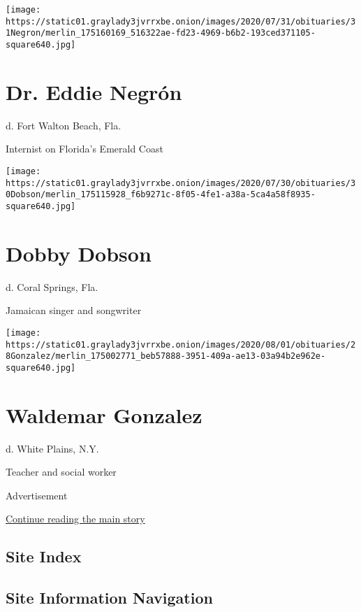 \texttt{[image: https://static01.graylady3jvrrxbe.onion/images/2020/07/31/obituaries/31Negron/merlin\_175160169\_516322ae-fd23-4969-b6b2-193ced371105-square640.jpg]}

\hypertarget{dr-eddie-negruxf3n}{%
\section{Dr. Eddie Negrón}\label{dr-eddie-negruxf3n}}

d. Fort Walton Beach, Fla.

Internist on Florida's Emerald Coast

\texttt{[image: https://static01.graylady3jvrrxbe.onion/images/2020/07/30/obituaries/30Dobson/merlin\_175115928\_f6b9271c-8f05-4fe1-a38a-5ca4a58f8935-square640.jpg]}

\hypertarget{dobby-dobson}{%
\section{Dobby Dobson}\label{dobby-dobson}}

d. Coral Springs, Fla.

Jamaican singer and songwriter

\texttt{[image: https://static01.graylady3jvrrxbe.onion/images/2020/08/01/obituaries/28Gonzalez/merlin\_175002771\_beb57888-3951-409a-ae13-03a94b2e962e-square640.jpg]}

\hypertarget{waldemar-gonzalez}{%
\section{Waldemar Gonzalez}\label{waldemar-gonzalez}}

d. White Plains, N.Y.

Teacher and social worker

Advertisement

\protect\hyperlink{after-bottom}{Continue reading the main story}

\hypertarget{site-index}{%
\subsection{Site Index}\label{site-index}}

\hypertarget{site-information-navigation}{%
\subsection{Site Information
Navigation}\label{site-information-navigation}}

